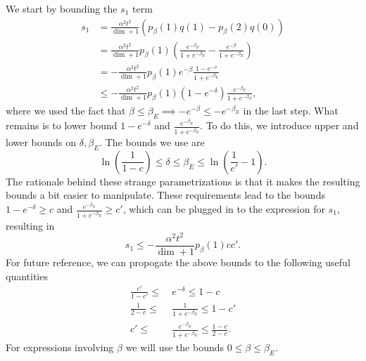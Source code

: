 \documentclass{article}
\newcommand{\parens}[1]{\left( #1 \right)}
\begin{document}
We start by bounding the $s_1$ term
\begin{align}
    s_1 &= \frac{\alpha^2 t^2}{\dim + 1} (p_{\beta}(1)q(1) - p_{\beta}(2) q(0)) \\
    &= \frac{\alpha^2 t^2}{\dim + 1} p_{\beta}(1)\left( \frac{e^{-\beta_E}}{1 + e^{-\beta_E}} - \frac{e^{-\beta}}{1 + e^{-\beta_E}}\right) \\
    &= - \frac{\alpha^2 t^2}{\dim + 1} p_{\beta}(1) e^{-\beta} \frac{1 - e^{- \delta}}{1 + e^{-\beta_E}} \\
    &\le - \frac{\alpha^2 t^2}{\dim + 1} p_{\beta}(1) (1 - e^{-\delta}) \frac{e^{-\beta_E}}{1 + e^{-\beta_E}},
\end{align}
where we used the fact that $\beta \le \beta_E \implies -e^{-\beta} \le -e^{-\beta_E}$ in the last step. What remains is to lower bound $1 - e^{-\delta}$ and $\frac{e^{-\beta_E}}{1 + e^{-\beta_E}}$. To do this, we introduce upper and lower bounds on $\delta, \beta_E$. The bounds we use are
\begin{equation}
    \ln \left( \frac{1}{1 - c} \right) \le \delta \le \beta_E \le \ln \left( \frac{1}{c'} - 1 \right).
\end{equation}
The rationale behind these strange parametrizations is that it makes the resulting bounds a bit easier to manipulate. These requirements lead to the bounds
$1 - e^{-\delta} \ge c$ and $\frac{e^{-\beta_E}}{1 + e^{-\beta_E}} \geq c'$, which can be plugged in to the expression for $s_1$, resulting in
\begin{equation}
s_1 \le - \frac{\alpha^2 t^2}{\dim + 1} p_{\beta}(1)c c'.
\end{equation}
For future reference, we can propogate the above bounds to the following useful quantities
\begin{align}
    \frac{c'}{1 - c'} \leq ~&e^{-\delta} \leq 1 - c \\
    \frac{1}{2 - c} \le ~&\frac{1}{1 + e^{-\beta_E}} \le 1 - c' \\
    c' \le ~&\frac{e^{-\beta_E}}{1 + e^{-\beta_E}} \le \frac{1 - c}{2 - c}.
\end{align}
For expressions involving $\beta$ we will use the bounds $0 \le \beta \le \beta_E$.
\end{document}
